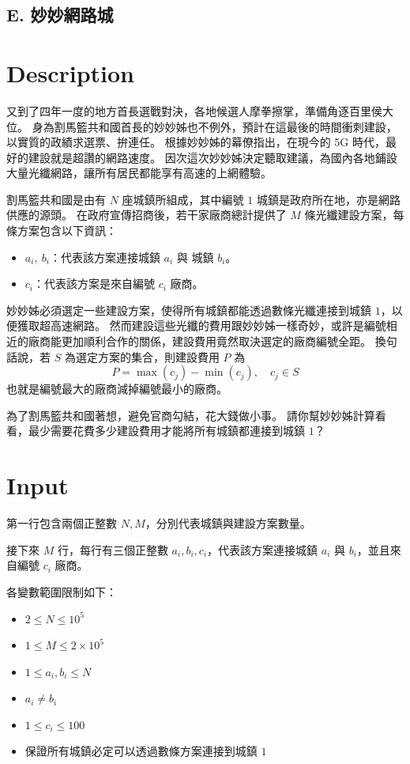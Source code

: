 \documentclass[11pt,a4paper]{article}
\begin{document}
\begin{center}
\section*{E. 妙妙網路城}
\end{center}

\section*{Description}

又到了四年一度的地方首長選戰對決，各地候選人摩拳擦掌，準備角逐百里侯大位。
身為割馬籃共和國首長的妙妙姊也不例外，預計在這最後的時間衝刺建設，以實質的政績求選票、拚連任。
根據妙妙姊的幕僚指出，在現今的 5G 時代，最好的建設就是超讚的網路速度。
因次這次妙妙姊決定聽取建議，為國內各地鋪設大量光纖網路，讓所有居民都能享有高速的上網體驗。

割馬籃共和國是由有 $N$ 座城鎮所組成，其中編號 $1$ 城鎮是政府所在地，亦是網路供應的源頭。
在政府宣傳招商後，若干家廠商總計提供了 $M$ 條光纖建設方案，每條方案包含以下資訊：
\begin{itemize}
	\item $a_i,\ b_i$：代表該方案連接城鎮 $a_i$ 與 城鎮 $b_i$。
	\item $c_i$：代表該方案是來自編號 $c_i$ 廠商。
\end{itemize}

妙妙姊必須選定一些建設方案，使得所有城鎮都能透過數條光纖連接到城鎮 $1$，以便獲取超高速網路。
然而建設這些光纖的費用跟妙妙姊一樣奇妙，或許是編號相近的廠商能更加順利合作的關係，建設費用竟然取決選定的廠商編號全距。
換句話說，若 $S$ 為選定方案的集合，則建設費用 $P$ 為 
$$
	P = \max(c_j) - \min(c_j),\quad c_j \in S
$$
也就是編號最大的廠商減掉編號最小的廠商。

為了割馬籃共和國著想，避免官商勾結，花大錢做小事。
請你幫妙妙姊計算看看，最少需要花費多少建設費用才能將所有城鎮都連接到城鎮 $1$？

\section*{Input}

第一行包含兩個正整數 $N, M$，分別代表城鎮與建設方案數量。

接下來 $M$ 行，每行有三個正整數 $a_i, b_i, c_i$，代表該方案連接城鎮 $a_i$ 與 $b_i$，並且來自編號 $c_i$ 廠商。

各變數範圍限制如下：
\begin{itemize}
    \item $2 \le N \le 10^5$
    \item $1 \le M \le 2\times 10^5$
    \item $1 \le a_i, b_i \le N$
    \item $a_i \neq b_i$
    \item $1 \le c_i \le 100$
    \item 保證所有城鎮必定可以透過數條方案連接到城鎮 $1$
\end{itemize}
\end{document}
